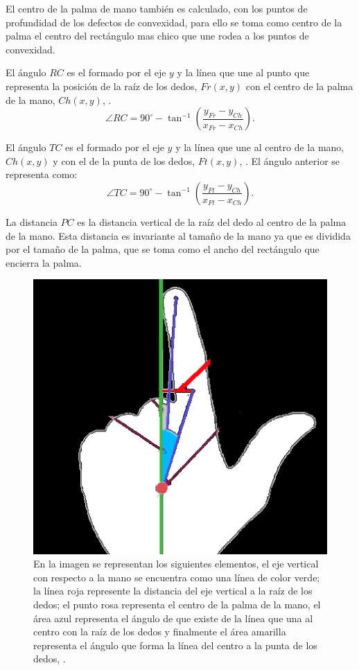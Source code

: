 El centro de la palma de mano también es calculado, con los puntos de profundidad de los defectos de convexidad, para ello se toma como centro de la palma el centro del rectángulo mas chico que une rodea a los puntos de convexidad. 

El ángulo $RC$ es el formado por el eje $y$  y la línea que une al punto que representa la posición de la raíz de los dedos, $Fr(x,y)$ con el centro de la palma de la mano, $Ch(x,y)$, \citep{Sgouropoulos2014}. 
$$ \angle RC = 90^\circ - \tan^{-1} \left( \frac{ y_{Fr}-y_{Ch} }{ x_{Fr}-x_{Ch} } \right).$$

El ángulo $TC$ es el formado por el eje $y$ y la línea que une al centro de la mano, $Ch(x,y)$ y con el de la punta de los dedos, $Ft(x,y)$, \citep{Sgouropoulos2014}. El  ángulo anterior se representa como:
$$ \angle TC = 90^\circ - \tan^{-1} \left( \frac{ y_{Ft}-y_{Ch} }{ x_{Ft}-x_{Ch} } \right).$$ 

La distancia $PC$ es la distancia vertical de la raíz del dedo al centro de la palma de la mano. Esta distancia es invariante al tamaño de la mano ya que es dividida por el tamaño de la palma, que se toma como el ancho del rectángulo que encierra la palma.  

\begin{figure}[h!]
\begin{center}
\includegraphics[scale=.6]{./Figures/angles.png}
\end{center}
\caption{En la imagen se representan los siguientes elementos, el eje vertical con respecto a la mano se encuentra como una línea de color verde; la línea roja represente la distancia del eje vertical a la raíz de los dedos; el punto rosa representa el centro de la palma de la mano, el área azul representa el ángulo de que existe de la línea que una al centro con la raíz de los dedos y finalmente el área amarilla representa el ángulo que forma la línea del centro a la punta de los dedos, \citep{Sgouropoulos2014}.}
\label{fig:anglesFingers}
\end{figure} 


